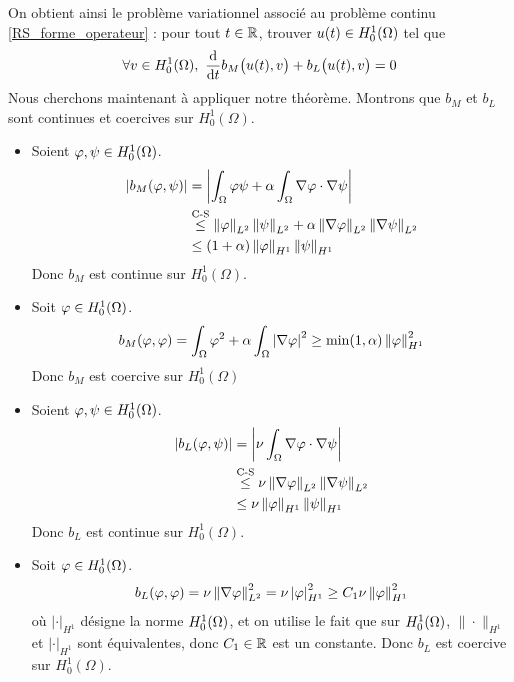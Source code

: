 On obtient ainsi le problème variationnel associé au problème continu \eqref{RS_forme_operateur} : pour tout $t \in \mathbb{R}$, trouver $u(t) \in H^1_0(\Omega)$ tel que
\begin{equation*}
    \forall v \in \Hone, \ \frac{\mathrm{d}}{\mathrm{d}t} b_M\big(u(t),v\big) + b_L\big(u(t),v\big) = 0
\end{equation*}
Nous cherchons maintenant à appliquer notre théorème. Montrons que $b_M$ et $b_L$ sont continues et coercives sur $H^1_0(\Omega)$.
\begin{itemize}
    \item Soient $\varphi, \psi \in H^1_0(\Omega)$.
    \begin{align*}
        \displaystyle\left\lvert  b_M(\varphi,\psi) \right\rvert &= \displaystyle\left\lvert \int_{\Omega}\varphi \psi + \alpha \int_{\Omega}\nabla\varphi\cdot\nabla\psi \right\rvert \\
        & \overset{\text{C-S}}\leq \left\lVert \varphi \right\rVert_{L^2}\left\lVert \psi \right\rVert_{L^2} + \alpha \left\lVert \nabla\varphi \right\rVert_{L^2}\left\lVert \nabla\psi \right\rVert_{L^2}  \\
        &\leq (1+\alpha)\left\lVert \varphi \right\rVert_{H^1}\left\lVert \psi \right\rVert_{H^1}
    \end{align*}
    Donc $b_M$ est continue sur $H^1_0(\Omega)$.
    \item Soit $\varphi \in H^1_0(\Omega)$.
    \begin{equation*}
        b_{M}(\varphi,\varphi) = \int_{\Omega} \varphi^2 + \alpha \int_{\Omega}\displaystyle\left\lvert \nabla \varphi \right\rvert^2 \geq \min(1,\alpha) \left\lVert \varphi \right\rVert^2_{H^1}
    \end{equation*}
    Donc $b_M$ est coercive sur $H^1_0(\Omega)$
    \item Soient $\varphi, \psi \in H^1_0(\Omega)$.
    \begin{align*}
        \displaystyle\left\lvert  b_L(\varphi,\psi) \right\rvert &= \displaystyle\left\lvert \nu \int_{\Omega}\nabla\varphi\cdot\nabla\psi \right\rvert\\
        & \overset{\text{C-S}}\leq \nu \left\lVert \nabla\varphi \right\rVert_{L^2}\left\lVert \nabla\psi \right\rVert_{L^2} \\
        &\leq \nu \left\lVert \varphi \right\rVert_{H^1}\left\lVert \psi \right\rVert_{H^1}
    \end{align*}
    Donc $b_L$ est continue sur $H^1_0(\Omega)$.
    \item Soit $\varphi \in H^1_0(\Omega)$.
    \begin{equation*}
        b_{L}(\varphi,\varphi) =\nu \left\lVert \nabla \varphi \right\rVert^2_{L^2}
        =\nu \displaystyle\left\lvert \varphi \right\rvert^2_{H^1} 
        \geq C_1 \nu \left\lVert \varphi \right\rVert^2_{H^1}
    \end{equation*}
    où $|\cdot|_{H^1}$ désigne la norme $H^1_0(\Omega)$, et on utilise le fait que sur $H^1_0(\Omega)$, $\|\cdot\|_{H^1}$ et $|\cdot|_{H^1}$ sont équivalentes, donc $C_1 \in \mathbb{R}$ est un constante. Donc $b_L$ est coercive sur $H^1_0(\Omega)$.
\end{itemize}
